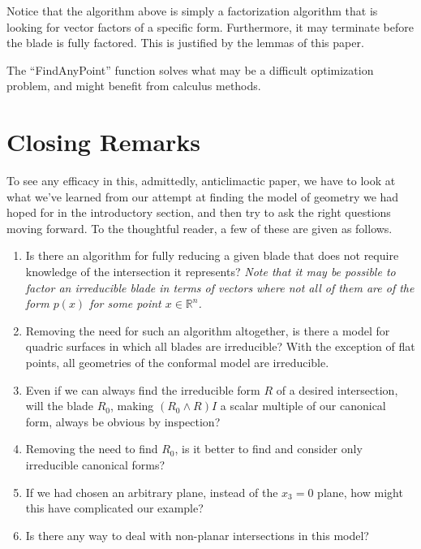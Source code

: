\documentclass{birkjour}
\theoremstyle{definition}
\theoremstyle{remark}
\numberwithin{equation}{section}
\newcommand{\R}{\mathbb{R}}
\begin{document}
Notice that the algorithm above is simply a factorization algorithm that is
looking for vector factors of a specific form.  Furthermore, it may
terminate before the blade is fully factored.  This is justified by the lemmas
of this paper.

The ``FindAnyPoint'' function solves what may be a difficult optimization problem,
and might benefit from calculus methods.

\section{Closing Remarks}

To see any efficacy in this, admittedly, anticlimactic paper, we have to look at what
we've learned from our attempt at finding the model of geometry we had hoped
for in the introductory section, and then try to ask the right questions moving forward.
To the thoughtful reader, a few of these are given as follows.

\begin{enumerate}

\item Is there an algorithm for fully reducing a given blade that does not
require knowledge of the intersection it represents?  {\it Note that it may
be possible to factor an irreducible blade in terms of vectors where not all
of them are of the form $p(x)$ for some point $x\in\R^n$.}

\item Removing the need for such an algorithm altogether, is there a model
for quadric surfaces in which all blades are irreducible?  With the exception
of flat points, all geometries of the conformal model are irreducible.

\item Even if we can always find the irreducible form $R$ of a desired intersection,
will the blade $R_0$, making $(R_0\wedge R)I$ a scalar multiple of our canonical
form, always be obvious by inspection?

\item Removing the need to find $R_0$, is it better to find and consider
only irreducible canonical forms?

\item If we had chosen an arbitrary plane,
instead of the $x_3=0$ plane, how might this have complicated our example?

\item Is there any way to deal with non-planar intersections in this model?
\end{enumerate}
\end{document}
